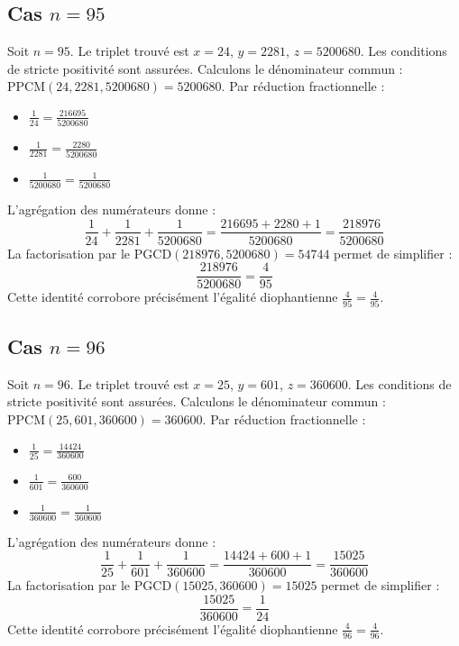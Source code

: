 \documentclass[11pt,a4paper]{article}
\begin{document}
\subsection{Cas $n = 95$}
Soit $n = 95$. Le triplet trouvé est $x = 24$, $y = 2281$, $z = 5200680$.
Les conditions de stricte positivité sont assurées.
Calculons le dénominateur commun : $\text{PPCM}(24, 2281, 5200680) = 5200680$.
Par réduction fractionnelle :
\begin{itemize}
    \item $\frac{1}{24} = \frac{216695}{5200680}$
    \item $\frac{1}{2281} = \frac{2280}{5200680}$
    \item $\frac{1}{5200680} = \frac{1}{5200680}$
\end{itemize}
L'agrégation des numérateurs donne :
$$ \frac{1}{24} + \frac{1}{2281} + \frac{1}{5200680} = \frac{216695 + 2280 + 1}{5200680} = \frac{218976}{5200680} $$
La factorisation par le $\text{PGCD}(218976, 5200680) = 54744$ permet de simplifier :
$$ \frac{218976}{5200680} = \frac{4}{95} $$
Cette identité corrobore précisément l'égalité diophantienne $\frac{4}{95} = \frac{4}{95}$.

\subsection{Cas $n = 96$}
Soit $n = 96$. Le triplet trouvé est $x = 25$, $y = 601$, $z = 360600$.
Les conditions de stricte positivité sont assurées.
Calculons le dénominateur commun : $\text{PPCM}(25, 601, 360600) = 360600$.
Par réduction fractionnelle :
\begin{itemize}
    \item $\frac{1}{25} = \frac{14424}{360600}$
    \item $\frac{1}{601} = \frac{600}{360600}$
    \item $\frac{1}{360600} = \frac{1}{360600}$
\end{itemize}
L'agrégation des numérateurs donne :
$$ \frac{1}{25} + \frac{1}{601} + \frac{1}{360600} = \frac{14424 + 600 + 1}{360600} = \frac{15025}{360600} $$
La factorisation par le $\text{PGCD}(15025, 360600) = 15025$ permet de simplifier :
$$ \frac{15025}{360600} = \frac{1}{24} $$
Cette identité corrobore précisément l'égalité diophantienne $\frac{4}{96} = \frac{4}{96}$.
\end{document}
